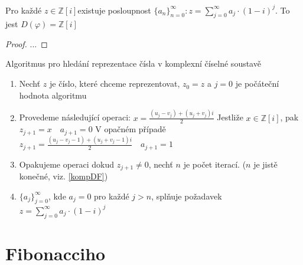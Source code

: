 \documentclass[czech,bachelor,dept470,male]{diploma}
\begin{document}
\begin{theorem}
	Pro každé $z \in \mathbb{Z}[i]$existuje posloupnost $\{a_n\}_{n=0}^\infty:z=
	\sum_{j=0}^{\infty}a_j\cdot(1-i)^j$.\newline
	To jest $D(\varphi)=\mathbb{Z}[i]$
\end{theorem}
\begin{proof}\label{kompDF}
	...
\end{proof}
\begin{remark} Algoritmus pro hledání reprezentace čísla v komplexní číselné soustavě
	\begin{enumerate}
		\item Nechť $z$ je číslo, které chceme reprezentovat, $z_0 = z$ a $j=0$ je počáteční hodnota algoritmu	
		\item Provedeme následující operaci:\newline
		$x = \frac{(u_j-v_j)+(u_j+v_j)i}{2}$\newline
		Jestliže $x \in \mathbb{Z}[i]$, pak $z_{j+1} = x \quad a_{j+1}=0$\newline
		V opačném případě $z_{j+1} = \frac{(u_j-v_j-1)+(u_j+v_j-1)i}{2}\quad a_{j+1}=1$
		\item Opakujeme operaci dokud $z_{j+1}\ne0$, nechť $n$ je počet iterací. ($n$ je jistě konečné, viz. \ref{kompDF})
		\item $\{a_j\}_{j=0}^{\infty}$, kde $a_j=0$ pro každé $j>n$, splňuje požadavek $z=
		\sum_{j=0}^{\infty}a_j\cdot(1-i)^j$
	\end{enumerate}
\end{remark}

\section{Fibonacciho}
\end{document}
